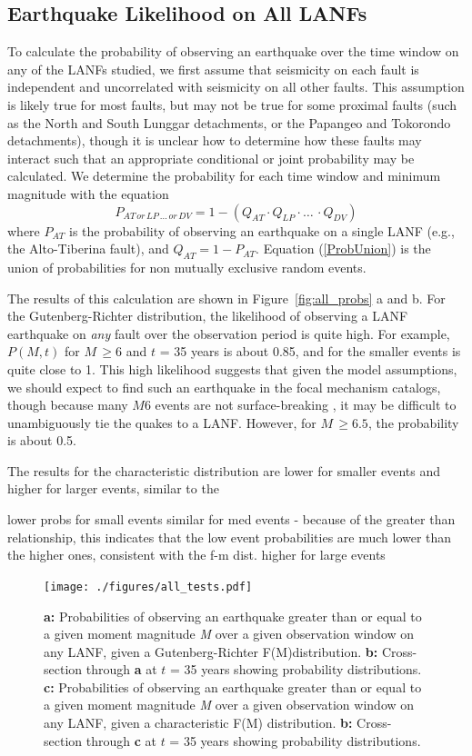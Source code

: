 \documentclass[draft,grl]{AGUTeX}
\begin{document}
\begin{article}
\subsection{Earthquake Likelihood on All LANFs}
To calculate the probability of observing an earthquake over the time
window on any of the LANFs studied, we first assume that seismicity on
each fault is independent and uncorrelated with seismicity on all
other faults. This assumption is likely true for most faults, but may
not be true for some proximal faults (such as the North and South
Lunggar detachments, or the Papangeo and Tokorondo detachments),
though it is unclear how to determine how these faults may interact 
such that an appropriate conditional or joint probability may be calculated. 
We determine the probability for each time window and minimum magnitude
with the equation
\begin{equation}
P_{AT \, or \, LP\, \ldots \, or \, DV} = 1 - (Q_{AT} \cdot Q_{LP} \cdot \ldots \, \cdot Q_{DV})
\label{ProbUnion}
\end{equation}
where $P_{AT}$ is the probability of observing an earthquake on a
single LANF (e.g., the Alto-Tiberina fault), and $Q_{AT} = 1 -
P_{AT}$. Equation (\ref{ProbUnion}) is the union of probabilities for
non mutually exclusive random events.

The results of this calculation are shown in Figure~\ref{fig:all_probs} a and b.
For the Gutenberg-Richter distribution, the likelihood of observing a LANF
earthquake on \emph{any} fault over the observation period is quite high.
For example, $P(M,t)$ for $M \, \ge 6$ and $t$ = 35 years is about 0.85, and
for the smaller events is quite close to 1.
This high likelihood suggests that given the model assumptions, we should
expect to find such an earthquake in the focal mechanism catalogs, though
because many $M6$ events are not surface-breaking \citep{hecker2013eqdist}, it may be difficult to unambiguously tie the quakes to a LANF.
However, for $M \, \ge 6.5$, the probability is about 0.5. 

The results for the characteristic distribution are lower for smaller events
and higher for larger events, similar to the 

lower probs for small events
similar for med events
	- because of the greater than relationship, this indicates that the low
	  event probabilities are much lower than the higher ones, consistent with
	  the f-m dist.
higher for large events


\begin{figure}%
\noindent\texttt{[image: ./figures/all\_tests.pdf]}
\caption{\textbf{a:} Probabilities of observing an earthquake greater than or 
equal to a given moment magnitude \emph{M} over a given observation window on 
any LANF, given a Gutenberg-Richter F(M)distribution. 
\textbf{b:} Cross-section through \textbf{a} at $t$ = 35 years
showing probability distributions.
\textbf{c:} Probabilities of observing an earthquake greater than or 
equal to a given moment magnitude \emph{M} over a given observation window on 
any LANF, given a characteristic F(M) distribution. 
\textbf{b:} Cross-section through \textbf{c} at $t$ = 35 years
showing probability distributions.}


\end{figure}
\end{article}
\end{document}
